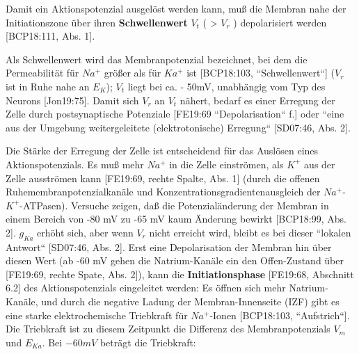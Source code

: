 {{Damit ein Aktionspotenzial ausgelöst werden kann, muß die Membran nahe der Initiationszone über ihren \textbf{Schwellenwert} \footnotemark[42] $V_t$ ( > $V_r$ ) depolarisiert werden [BCP18:111, Abs. 1].


 Als Schwellenwert wird das Membranpotenzial bezeichnet, bei dem die Permeabilität für $Na^+$ größer als für $Ka^+$ ist [BCP18:103, ``Schwellenwert``] ($V_r$ ist in Ruhe nahe an $E_K$); $V_t$ liegt bei ca. - 50mV, unabhängig vom Typ des Neurons [Jon19:75].
 Damit sich $V_r$ an $V_t$ nähert, bedarf es einer Erregung der Zelle durch postsynaptische Potenziale [FE19:69 ``Depolarisation`` f.] oder ``eine aus der Umgebung weitergeleitete (elektrotonische) Erregung`` [SD07:46, Abs. 2].

Die Stärke der Erregung der Zelle ist entscheidend für das Auslösen eines Aktionspotenzials. Es muß mehr $Na^+$ in die Zelle einströmen, als $K^+$ aus der Zelle ausströmen kann [FE19:69, rechte Spalte, Abs. 1] (durch die offenen Ruhemembranpotenzialkanäle und Konzentrationsgradientenausgleich der $Na^+$-$K^+$-ATPasen).
Versuche zeigen, daß die Potenzialänderung der Membran in einem Bereich von -80 mV zu -65 mV kaum Änderung bewirkt [BCP18:99, Abs. 2]. $g_{Ka}$ erhöht sich, aber wenn $V_r$ nicht erreicht wird, bleibt es bei dieser ``lokalen Antwort`` [SD07:46, Abs. 2]. Erst eine Depolarisation der Membran hin über diesen Wert (ab -60 mV gehen die Natrium-Kanäle ein den Offen-Zustand über [FE19:69, rechte Spate, Abs. 2]), kann die \textbf{Initiationsphase} [FE19:68, Abschnitt 6.2] des Aktionspotenzials eingeleitet werden: Es öffnen sich mehr Natrium-Kanäle, und durch die negative Ladung der Membran-Innenseite (IZF) gibt es eine starke elektrochemische Triebkraft für $Na^+$-Ionen [BCP18:103, ``Aufstrich``]. Die Triebkraft ist zu diesem Zeitpunkt die Differenz des Membranpotenzials $V_m$ und $E_{Ka}$. Bei $-60 mV$ beträgt die Triebkraft\footnotemark[43]:

}}
